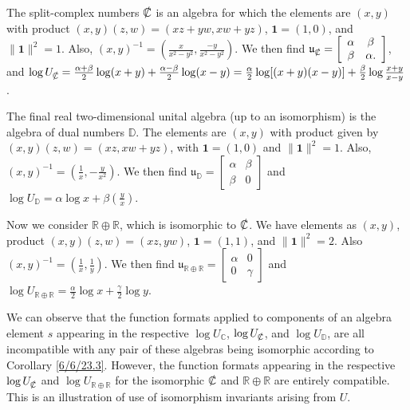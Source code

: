 \documentclass{amsart}
\numberwithin{equation}{section}
\theoremstyle{definition}
\numberwithin{theorem}{section}
\begin{document}
The split-complex numbers $\slashed{\mathbb{C}}$ is an algebra for which the elements are  $(x,y)$ with product $(x,y)(z,w) = (xz+yw,xw+yz)$, $ \mathbf{1} = (1,0)$, and $\|\mathbf{1}\|^2 = 1$.  Also, $(x,y)^{-1} = (\frac{x}{x^2-y^2},\frac{-y}{x^2-y^2})$.  We then find $\mathfrak{u}_{\slashed{\mathbb{C}}} = \left[\begin{array}{ccc}
 \alpha & \beta   \\ 
 \beta & \alpha.    
\end{array}\right]$, and $\log  U_{\slashed{\mathbb{C}}} = \frac{\alpha+\beta}{2}\log(x+y) + \frac{\alpha-\beta}{2}\log(x-y) = \frac{\alpha}{2}\log[(x+
y)(x-y)] +  \frac{\beta}{2}\log \frac{x+y}{x-y}$.

The final real two-dimensional unital algebra (up to an isomorphism) is the algebra of dual numbers $\mathbb{D}$.  The elements are $(x,y)$ with product given by $(x,y)(z,w) = (xz,xw+yz)$, with $\mathbf{1}=(1,0)$ and $\|\mathbf{1}\|^2 = 1$. Also, $(x,y)^{-1} = (\frac{1}{x},-\frac{y}{x^2})$.  We then find $\mathfrak{u}_\mathbb{D} = \left[\begin{array}{ccc}
 \alpha & \beta   \\ 
 \beta & 0    
\end{array}\right]$ and $\log  U_{\mathbb{D}} = \alpha\log x + \beta\left(\frac{y}{x}\right)$.

Now we consider $\mathbb{R}\oplus\mathbb{R}$, which is isomorphic to $\slashed{\mathbb{C}}$.  We have elements as $(x,y)$, product $(x,y)(z,w) = (xz,yw)$, $\mathbf{1}=(1,1)$, and $\|\mathbf{1}\|^2 = 2$.  Also $(x,y)^{-1} = (\frac{1}{x},\frac{1}{y})$.  We then find $\mathfrak{u}_{\mathbb{R}\oplus\mathbb{R}} = \left[\begin{array}{ccc}
 \alpha & 0   \\ 
 0 & \gamma    
\end{array}\right]$ and $\log  U_{\mathbb{R}\oplus\mathbb{R}} = \frac{\alpha}{2}\log x + \frac{\gamma}{2}\log y$.

We can observe that the function formats applied to components of an algebra element $s$ appearing in the respective $\log U_{\mathbb{C}}$, $\log U_{\slashed{\mathbb{C}}}$, and $\log U_{\mathbb{D}}$, are all incompatible with any pair of these algebras being isomorphic according to Corollary \ref{6/6/23.3}.  However, the function formats appearing in the respective $\log U_{\slashed{\mathbb{C}}}$ and $\log U_{\mathbb{R}\oplus\mathbb{R}}$  for the isomorphic $\slashed{\mathbb{C}}$ and $\mathbb{R}\oplus\mathbb{R}$ are entirely compatible.  This is an illustration of use of isomorphism invariants arising from $U$.
\end{document}

